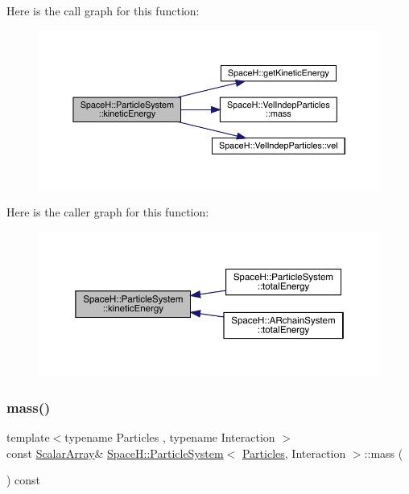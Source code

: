 Here is the call graph for this function\+:
\nopagebreak
\begin{figure}[H]
\begin{center}
\leavevmode
\includegraphics[width=350pt]{class_space_h_1_1_particle_system_acf2ffbad4476dae3f259a60338d80288_cgraph}
\end{center}
\end{figure}
Here is the caller graph for this function\+:
\nopagebreak
\begin{figure}[H]
\begin{center}
\leavevmode
\includegraphics[width=350pt]{class_space_h_1_1_particle_system_acf2ffbad4476dae3f259a60338d80288_icgraph}
\end{center}
\end{figure}
\mbox{\label{class_space_h_1_1_particle_system_aa639ed5d2edbbfd49964d012e1971807}} 
\subsubsection{\texorpdfstring{mass()}{mass()}\hspace{0.1cm}{\footnotesize\ttfamily [1/2]}}
{\footnotesize\ttfamily template$<$typename Particles , typename Interaction $>$ \\
const \mbox{\hyperlink{class_space_h_1_1_particle_system_a7c621641dbb2bb4192af568758ed07bb}{Scalar\+Array}}\& \mbox{\hyperlink{class_space_h_1_1_particle_system}{Space\+H\+::\+Particle\+System}}$<$ \mbox{\hyperlink{struct_space_h_1_1_particles}{Particles}}, Interaction $>$\+::mass (\begin{DoxyParamCaption}{ }\end{DoxyParamCaption}) const\hspace{0.3cm}{\ttfamily [inline]}}



